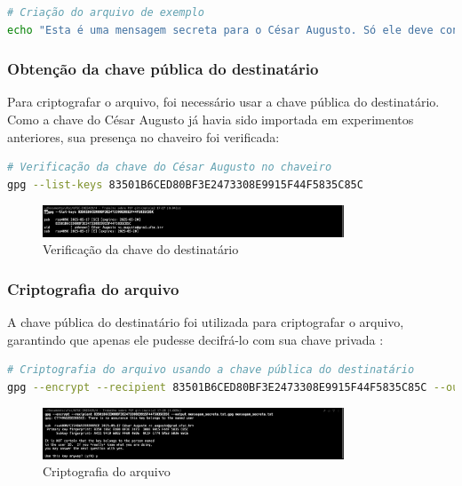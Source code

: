\begin{lstlisting}[language=bash]
# Criação do arquivo de exemplo
echo "Esta é uma mensagem secreta para o César Augusto. Só ele deve conseguir ler!" > mensagem_secreta.txt
\end{lstlisting}

\subsubsection{Obtenção da chave pública do destinatário}
Para criptografar o arquivo, foi necessário usar a chave pública do destinatário. Como a chave do César Augusto já havia sido importada em experimentos anteriores, sua presença no chaveiro foi verificada:

\begin{lstlisting}[language=bash]
# Verificação da chave do César Augusto no chaveiro
gpg --list-keys 83501B6CED80BF3E2473308E9915F44F5835C85C
\end{lstlisting}

\begin{figure}[htb]
    \centering
    \includegraphics[width=0.8\textwidth]{images/10-verificacao_chave_destinatario.jpg}
    \caption{Verificação da chave do destinatário}
    \label{fig:verificacao-chave-dest}
\end{figure}

\subsubsection{Criptografia do arquivo}
A chave pública do destinatário foi utilizada para criptografar o arquivo, garantindo que apenas ele pudesse decifrá-lo com sua chave privada \cite{rfc4880}:

\begin{lstlisting}[language=bash]
# Criptografia do arquivo usando a chave pública do destinatário
gpg --encrypt --recipient 83501B6CED80BF3E2473308E9915F44F5835C85C --output mensagem_secreta_cesar.txt.gpg mensagem_secreta.txt
\end{lstlisting}

\begin{figure}[htb]
    \centering
    \includegraphics[width=0.8\textwidth]{images/10-criptografia_arquivo.jpg}
    \caption{Criptografia do arquivo}
    \label{fig:criptografia-arquivo}
\end{figure}

